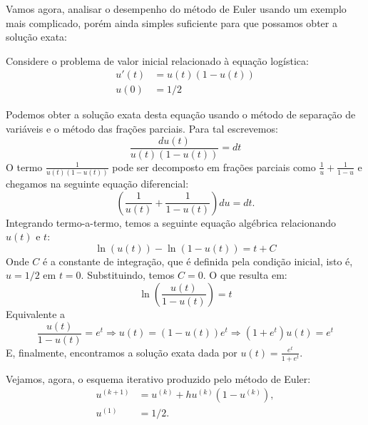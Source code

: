 Vamos agora, analisar o desempenho do método de Euler usando um exemplo mais complicado, porém ainda simples suficiente para que possamos obter a solução exata:
\begin{ex}\label{ex:ex_euler_1}
Considere o problema de valor inicial relacionado à equação logística:
\begin{equation}\label{eq:logistica}
  \begin{split}
    u'(t)&= u(t)(1-u(t))\\
    u(0)&= 1/2
  \end{split}
\end{equation}
\end{ex}
Podemos obter a solução exata desta equação usando o método de separação de variáveis e o método das frações parciais. Para tal escrevemos:
\begin{equation}
\frac{du(t)}{u(t)(1-u(t))}=dt
\end{equation}
O termo $\frac{1}{u(t)(1-u(t))}$ pode ser decomposto em frações parciais como $\frac{1}{u}+\frac{1}{1-u}$ e chegamos na seguinte equação diferencial:
\begin{equation}
\left(\frac{1}{u(t)}+\frac{1}{1-u(t)}\right)du=dt.
\end{equation}
Integrando termo-a-termo, temos a seguinte equação algébrica relacionando $u(t)$ e $t$:
\begin{equation}
\ln(u(t))-\ln\left(1-u(t)\right)=t+C
\end{equation}
Onde $C$ é a constante de integração, que é definida pela condição inicial, isto é, $u=1/2$ em $t=0$. Substituindo, temos $C=0$. O que resulta em:
\begin{equation}
\ln\left(\frac{u(t)}{1-u(t)}\right)=t
\end{equation}
Equivalente a
\begin{equation}
\frac{u(t)}{1-u(t)}=e^{t} \Longrightarrow u(t)=(1-u(t))e^{t} \Longrightarrow (1+e^t)u(t)=e^{t}
\end{equation}
E, finalmente, encontramos a solução exata dada por $u(t)=\frac{e^t}{1+e^{t}}$.

Vejamos, agora, o esquema iterativo produzido pelo método de Euler:
\begin{equation}
 \begin{split}
u^{(k+1)}&= u^{(k)}+h u^{(k)}(1-u^{(k)}), \\
u^{(1)}&= 1/2.
 \end{split}
\end{equation}

